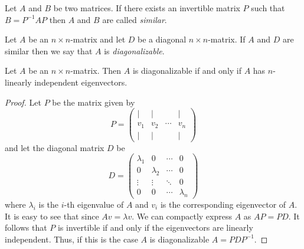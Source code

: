 \begin{definition}[Similarity]
	Let $A$ and $B$ be two matrices. If there exists an invertible matrix $P$ such that $B = P^{-1} AP$ then  $A$ and $B$ are called \emph{similar}.
\end{definition}
\begin{definition}[Diagonalizable]
	Let $A$ be an $n\times n$-matrix and let $D$ be a diagonal $n\times n$-matrix. If $A$ and $D$ are similar then we say that $A$ is \emph{diagonalizable}.
\end{definition}
\begin{theorem}
	Let $A$ be an $n\times n$-matrix. Then $A$ is diagonalizable if and only if $A$ has $n$-linearly independent eigenvectors.
	\begin{proof}
		Let $P$ be the matrix given by
		$$
		P = \begin{pmatrix}
			| & | & & |\\
			v_1 & v_2 & \cdots & v_n\\
			| & | & & |
		\end{pmatrix}
		$$
		and let the diagonal matrix $D$ be
		$$
		D = \begin{pmatrix}
			\lambda_1 & 0 & \cdots & 0\\
			0 & \lambda_2 & \cdots & 0\\
			\vdots & \vdots & \ddots & 0\\
			0 & 0 & \cdots & \lambda_n
		\end{pmatrix}
		$$
		where $\lambda_i$ is the $i$-th eigenvalue of $A$ and $v_i$ is the corresponding eigenvector of $A$. It is easy to see that since $Av = \lambda v$. We can compactly express $A$ as $AP = PD$. It follows that $P$ is invertible if and only if the eigenvectors are linearly independent. Thus, if this is the case $A$ is diagonalizable $A = PDP^{-1}$.
	\end{proof}
\end{theorem}



\clearpage